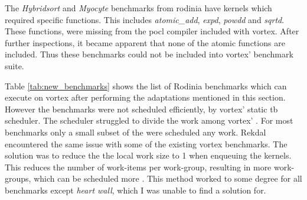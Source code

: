 
The \textit{Hybridsort} and \textit{Myocyte} benchmarks from \Gls{rodinia} have kernels which required specific functions. This includes \textit{atomic\_add}, \textit{expd}, \textit{powdd} and \textit{sqrtd}. These functions, were missing from the \Gls{pocl} compiler included with \Gls{vortex}. After further inspections, it became apparent that none of the atomic functions are included. Thus these benchmarks could not be included into \Gls{vortex}' benchmark suite.

Table \ref{tab:new_benchmarks} shows the list of Rodinia benchmarks which can execute on \Gls{vortex} after performing the adaptations mentioned in this section. However the benchmarks were not scheduled efficiently, by \Gls{vortex}' static \acrshort{tb} scheduler. The scheduler struggled to divide the work among \Gls{vortex}' . For most benchmarks only a small subset of the  were scheduled any work. Rekdal \cite{Rekdal_Master} encountered the same issue with some of the existing \Gls{vortex} benchmarks. The solution was to reduce the the local work size to 1 when enqueuing the kernels. This reduces the number of work-items per work-group, resulting in more work-groups, which can be scheduled more . This method worked to some degree for all benchmarks except \textit{heart wall}, which I was unable to find a solution for.  

